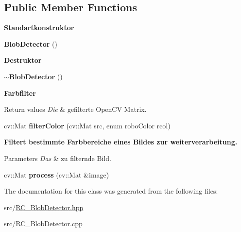 \subsection*{Public Member Functions}
\begin{Indent}{\bf Standartkonstruktor}\par
\begin{DoxyCompactItemize}
\item 
\hypertarget{classrc_1_1BlobDetector_af7e4f2625974457c6949970d6bdd25dd}{{\bfseries Blob\+Detector} ()}\label{classrc_1_1BlobDetector_af7e4f2625974457c6949970d6bdd25dd}

\end{DoxyCompactItemize}
\end{Indent}
\begin{Indent}{\bf Destruktor}\par
\begin{DoxyCompactItemize}
\item 
\hypertarget{classrc_1_1BlobDetector_a39ef0b4e8945d64e9348923a8cf57377}{{\bfseries $\sim$\+Blob\+Detector} ()}\label{classrc_1_1BlobDetector_a39ef0b4e8945d64e9348923a8cf57377}

\end{DoxyCompactItemize}
\end{Indent}
\begin{Indent}{\bf Farbfilter}\par
{\em 
\begin{DoxyRetVals}{Return values}
{\em Die} & gefilterte Open\+C\+V Matrix. \\
\hline
\end{DoxyRetVals}
}\begin{DoxyCompactItemize}
\item 
\hypertarget{classrc_1_1BlobDetector_a1bec455c6bf7d4d8b2ae7c114320a8f1}{cv\+::\+Mat {\bfseries filter\+Color} (cv\+::\+Mat src, enum robo\+Color rcol)}\label{classrc_1_1BlobDetector_a1bec455c6bf7d4d8b2ae7c114320a8f1}

\end{DoxyCompactItemize}
\end{Indent}
\begin{Indent}{\bf Filtert bestimmte Farbbereiche eines Bildes zur weiterverarbeitung.}\par
{\em 
\begin{DoxyParams}{Parameters}
{\em Das} & zu filternde Bild. \\
\hline
\end{DoxyParams}
}\begin{DoxyCompactItemize}
\item 
\hypertarget{classrc_1_1BlobDetector_a07a996624a6ef0df47dacfd85f8be60b}{cv\+::\+Mat {\bfseries process} (cv\+::\+Mat \&image)}\label{classrc_1_1BlobDetector_a07a996624a6ef0df47dacfd85f8be60b}

\end{DoxyCompactItemize}
\end{Indent}


The documentation for this class was generated from the following files\+:\begin{DoxyCompactItemize}
\item 
src/\hyperlink{RC__BlobDetector_8hpp}{R\+C\+\_\+\+Blob\+Detector.\+hpp}\item 
src/R\+C\+\_\+\+Blob\+Detector.\+cpp\end{DoxyCompactItemize}
